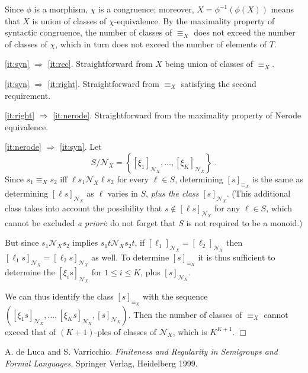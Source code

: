 \documentclass[12pt]{article}
\begin{document}
Since $\phi$ is a morphism, $\chi$ is a congruence;
moreover, $X=\phi^{-1}(\phi(X))$ means that
$X$ is union of classes of $\chi$-equivalence.
By the maximality property of syntactic congruence,
the number of classes of $\equiv_X$
does not exceed the number of classes of $\chi$,
which in turn does not exceed the number of elements of $T$.

\ref{it:syn} $\Rightarrow$ \ref{it:rec}.
Straightforward from $X$ being union of classes of $\equiv_X$.

\ref{it:syn} $\Rightarrow$ \ref{it:right}.
Straightforward from $\equiv_X$ satisfying the second requirement.

\ref{it:right} $\Rightarrow$ \ref{it:nerode}.
Straightforward from the maximality property of Nerode equivalence.

\ref{it:nerode} $\Rightarrow$ \ref{it:syn}.
Let
\begin{equation} \label{eq:nerode-finite}
S/\mathcal{N}_X
=\left\{[\xi_1]_{\mathcal{N}_X},\ldots,[\xi_K]_{\mathcal{N}_X}\right\}\;.
\end{equation}
Since $s_1\equiv_X s_2$ iff $\ell s_1\mathcal{N}_X \ell s_2$
for every $\ell \in S$,
determining $[s]_{\equiv_X}$
is the same as determining $[\ell s]_{\mathcal{N}_X}$
as $\ell$ varies in $S$,
\emph{plus the class $[s]_{\mathcal{N}_X}$}.
(This additional class takes into account the possibility
that $s \not \in [\ell s]_{\mathcal{N}_X}$ for any $\ell \in S$,
which cannot be excluded \emph{a priori}:
do not forget that $S$ is not required to be a monoid.)

But since $s_1\mathcal{N}_Xs_2$ implies $s_1t\mathcal{N}_Xs_2t$,
if $[\ell_1]_{\mathcal{N}_X}=[\ell_2]_{\mathcal{N}_X}$
then $[\ell_1 s]_{\mathcal{N}_X}=[\ell_2 s]_{\mathcal{N}_X}$ as well.
To determine $[s]_{\equiv_X}$
it is thus sufficient to determine the $[\xi_i s]_{\mathcal{N}_X}$
for $1\leq i\leq K$,
plus $[s]_{\mathcal{N}_X}$.

We can thus identify the class $[s]_{\equiv_X}$
with the sequence
\begin{math}
\left(
[\xi_1 s]_{\mathcal{N}_X},\ldots,[\xi_K s]_{\mathcal{N}_X},[s]_{\mathcal{N}_X}
\right).
\end{math}
Then the number of classes of $\equiv_X$
cannot exceed that of $(K+1)$-ples of classes of $\mathcal{N}_X$,
which is $K^{K+1}$.
\hfill$\Box$

\begin{thebibliography}{99}
A. de Luca and S. Varricchio.
\emph{Finiteness and Regularity in Semigroups and Formal Languages.}
Springer Verlag, Heidelberg 1999.
\end{thebibliography}

\end{document}
